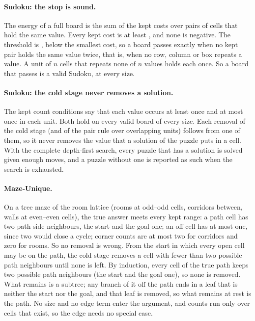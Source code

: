 \paragraph{Sudoku: the stop is sound.} The energy of a full board is the sum of the kept costs over pairs of cells that
hold the same value. Every kept cost is at least , and none is negative. The threshold is
, below the smallest cost, so a board passes exactly when no kept pair holds the same value twice, that is,
when no row, column or box repeats a value. A unit of $n$ cells that repeats none of $n$ values holds each once. So a
board that passes is a valid Sudoku, at every size.

\paragraph{Sudoku: the cold stage never removes a solution.} The kept count conditions say that each value occurs at
least once and at most once in each unit. Both hold on every valid board of every size. Each removal of the cold stage
(and of the pair rule over overlapping units) follows from one of them, so it never removes the value that a solution
of the puzzle puts in a cell. With the complete depth-first search, every puzzle that has a solution is solved given
enough moves, and a puzzle without one is reported as such when the search is exhausted.

\paragraph{Maze-Unique.} On a tree maze of the room lattice (rooms at odd--odd cells, corridors between, walls at
even--even cells), the true answer meets every kept range: a path cell has two path side-neighbours, the start and the
goal one; an off cell has at most one, since two would close a cycle; corner counts are at most two for corridors and
zero for rooms. So no removal is wrong. From the start in which every open cell may be on the path, the cold stage removes
a cell with fewer than two possible path neighbours until none is left. By induction, every cell of the true path keeps
two possible path neighbours (the start and the goal one), so none is removed. What remains is a subtree; any branch of
it off the path ends in a leaf that is neither the start nor the goal, and that leaf is removed, so what remains at rest
is the path. No size and no edge term enter the argument, and counts run only over cells
that exist, so the edge needs no special case.

